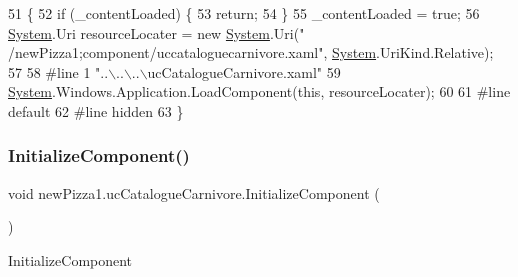 \begin{DoxyCode}
51                                           \{
52             \textcolor{keywordflow}{if} (\_contentLoaded) \{
53                 \textcolor{keywordflow}{return};
54             \}
55             \_contentLoaded = \textcolor{keyword}{true};
56             \hyperlink{namespaceSystem}{System}.Uri resourceLocater = \textcolor{keyword}{new} \hyperlink{namespaceSystem}{System}.Uri(\textcolor{stringliteral}{"
      /newPizza1;component/uccataloguecarnivore.xaml"}, \hyperlink{namespaceSystem}{System}.UriKind.Relative);
57             
58 \textcolor{preprocessor}{            #line 1 "..\(\backslash\)..\(\backslash\)..\(\backslash\)ucCatalogueCarnivore.xaml"}
59             \hyperlink{namespaceSystem}{System}.Windows.Application.LoadComponent(\textcolor{keyword}{this}, resourceLocater);
60             
61 \textcolor{preprocessor}{            #line default}
62 \textcolor{preprocessor}{            #line hidden}
63         \}
\end{DoxyCode}
\mbox{\label{classnewPizza1_1_1ucCatalogueCarnivore_ae3fbe460c9b1305f8cd5d685e12746ae}} 
\subsubsection{\texorpdfstring{Initialize\+Component()}{InitializeComponent()}\hspace{0.1cm}{\footnotesize\ttfamily [3/6]}}
{\footnotesize\ttfamily void new\+Pizza1.\+uc\+Catalogue\+Carnivore.\+Initialize\+Component (\begin{DoxyParamCaption}{ }\end{DoxyParamCaption})\hspace{0.3cm}{\ttfamily [inline]}}



Initialize\+Component 


